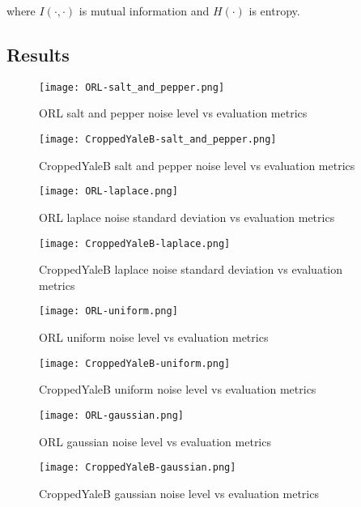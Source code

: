 \documentclass{article} %
\begin{document}
where $I\left(\cdot,\cdot\right)$ is mutual information and $H\left(\cdot\right)$ is entropy.

\subsection{Results}
\begin{figure}
\texttt{[image: ORL-salt\_and\_pepper.png]}
\caption{ORL salt and pepper noise level vs evaluation metrics \label{fig:ORL-salt_and_pepper}}
\end{figure}
\begin{figure}
\texttt{[image: CroppedYaleB-salt\_and\_pepper.png]}
\caption{CroppedYaleB salt and pepper noise level vs evaluation metrics \label{fig:CroppedYaleB-salt_and_pepper}}
\end{figure}

\begin{figure}
\texttt{[image: ORL-laplace.png]}
\caption{ORL laplace noise standard deviation vs evaluation metrics \label{fig:ORL-laplace}}
\end{figure}
\begin{figure}
\texttt{[image: CroppedYaleB-laplace.png]}
\caption{CroppedYaleB laplace noise standard deviation vs evaluation metrics \label{fig:CroppedYaleB-laplace}}
\end{figure}

\begin{figure}
\texttt{[image: ORL-uniform.png]}
\caption{ORL uniform noise level vs evaluation metrics \label{fig:ORL-uniform}}
\end{figure}
\begin{figure}
\texttt{[image: CroppedYaleB-uniform.png]}
\caption{CroppedYaleB uniform noise level vs evaluation metrics \label{fig:CroppedYaleB-uniform}}
\end{figure}

\begin{figure}
\texttt{[image: ORL-gaussian.png]}
\caption{ORL gaussian noise level vs evaluation metrics \label{fig:ORL-gaussian}}
\end{figure}
\begin{figure}
\texttt{[image: CroppedYaleB-gaussian.png]}
\caption{CroppedYaleB gaussian noise level vs evaluation metrics \label{fig:CroppedYaleB-gaussian}}
\end{figure}
\end{document}
